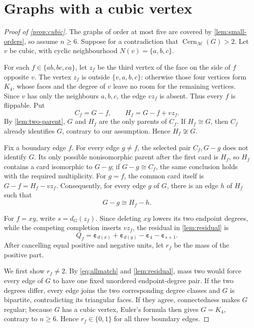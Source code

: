 \documentclass[11pt]{article}
\theoremstyle{definition}
\theoremstyle{remark}
\newcommand{\M}{\mathcal M}
\newcommand{\Cern}{\operatorname{Cern}}
\newcommand{\eps}{\boldsymbol\varepsilon}
\begin{document}
\section{Graphs with a cubic vertex}\label{app:cubic}

\begin{proof}[Proof of \cref{prop:cubic}]
The graphs of order at most five are covered by
\cref{lem:small-orders}, so assume \(n\ge6\).  Suppose for a contradiction
that \(\Cern_{\M}(G)>2\).  Let \(v\) be cubic, with cyclic neighbourhood
\(N(v)=\{a,b,c\}\).

For each \(f\in\{ab,bc,ca\}\), let \(z_f\) be the third vertex of the face
on the side of \(f\) opposite \(v\).  The vertex \(z_f\) is outside
\(\{v,a,b,c\}\): otherwise those four vertices form \(K_4\), whose faces
and the degree of \(v\) leave no room for the remaining vertices.  Since
\(v\) has only the neighbours \(a,b,c\), the edge \(vz_f\) is absent.
Thus every \(f\) is flippable.  Put
\[
             C_f=G-f,\qquad H_f=G-f+vz_f.
\]
By \cref{lem:two-parent}, \(G\) and \(H_f\) are the only parents of
\(C_f\).  If \(H_f\cong G\), then \(C_f\) already identifies \(G\),
contrary to our assumption.  Hence \(H_f\not\cong G\).

Fix a boundary edge \(f\).  For every edge \(g\ne f\), the selected pair
\(C_f,G-g\) does not identify \(G\).  Its only possible nonisomorphic parent
after the first card is \(H_f\), so \(H_f\) contains a card isomorphic to
\(G-g\); if \(G-g\cong C_f\), the same conclusion holds with the required
multiplicity.  For \(g=f\), the common card itself is
\(G-f=H_f-vz_f\).  Consequently, for every edge \(g\) of \(G\), there is an
edge \(h\) of \(H_f\) such that
\[
                         G-g\cong H_f-h.           \tag{E.1}\label{eq:allmatch}
\]

For \(f=xy\), write \(s=d_G(z_f)\).  Since deleting \(xy\) lowers its two
endpoint degrees, while the competing completion inserts \(vz_f\), the
residual in \cref{lem:residual} is
\[
 Q_f=\eps_{d(x)}+\eps_{d(y)}-\eps_4-\eps_{s+1}.    \tag{E.2}\label{eq:cubicQ}
\]
After cancelling equal positive and negative units, let \(r_f\) be the mass
of the positive part.

We first show \(r_f\ne2\).  By \eqref{eq:allmatch} and
\cref{lem:residual}, mass two would force every edge of \(G\) to have one
fixed unordered endpoint-degree pair.  If the two degrees differ, every edge
joins the two corresponding degree classes and \(G\) is bipartite,
contradicting its triangular faces.  If they agree, connectedness makes
\(G\) regular; because \(G\) has a cubic vertex, Euler's formula then gives
\(G=K_4\), contrary to \(n\ge6\).  Hence \(r_f\in\{0,1\}\) for all three
boundary edges.


\end{proof}
\end{document}
